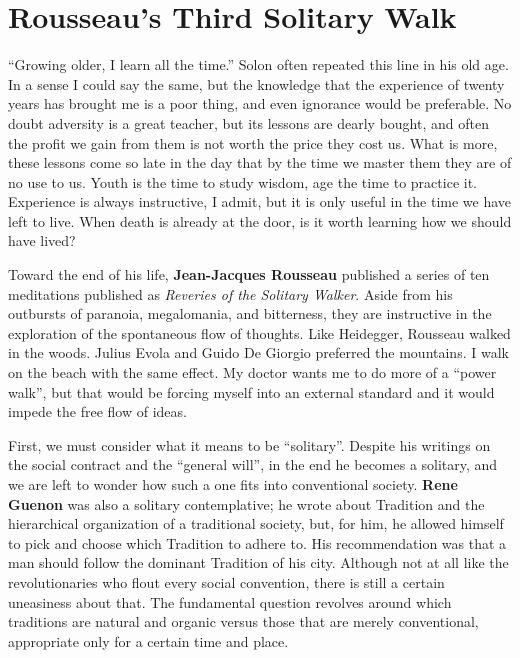 \section{Rousseau’s Third Solitary Walk}

\begin{quotex}
``Growing older, I learn all the time.'' Solon often repeated this line in his old age. In a sense I could say the same, but the knowledge that the experience of twenty years has brought me is a poor thing, and even ignorance would be preferable. No doubt adversity is a great teacher, but its lessons are dearly bought, and often the profit we gain from them is not worth the price they cost us. What is more, these lessons come so late in the day that by the time we master them they are of no use to us. Youth is the time to study wisdom, age the time to practice it. Experience is always instructive, I admit, but it is only useful in the time we have left to live. When death is already at the door, is it worth learning how we should have lived?
\end{quotex}


Toward the end of his life, \textbf{Jean-Jacques Rousseau} published a series of ten meditations published as \emph{Reveries of the Solitary Walker}. Aside from his outbursts of paranoia, megalomania, and bitterness, they are instructive in the exploration of the spontaneous flow of thoughts. Like Heidegger, Rousseau walked in the woods. Julius Evola and Guido De Giorgio preferred the mountains. I walk on the beach with the same effect. My doctor wants me to do more of a ``power walk'', but that would be forcing myself into an external standard and it would impede the free flow of ideas.

First, we must consider what it means to be ``solitary''. Despite his writings on the social contract and the ``general will'', in the end he becomes a solitary, and we are left to wonder how such a one fits into conventional society. \textbf{Rene Guenon} was also a solitary contemplative; he wrote about Tradition and the hierarchical organization of a traditional society, but, for him, he allowed himself to pick and choose which Tradition to adhere to. His recommendation was that a man should follow the dominant Tradition of his city. Although not at all like the revolutionaries who flout every social convention, there is still a certain uneasiness about that. The fundamental question revolves around which traditions are natural and organic versus those that are merely conventional, appropriate only for a certain time and place.

